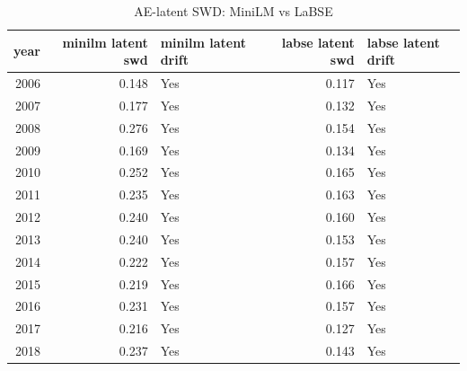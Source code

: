 \begin{table}[ht]
\centering
\caption{AE-latent SWD: MiniLM vs LaBSE}
\label{tab:minilm_vs_labse_latent_swd}
\begin{tabular}{rrlrl}
\toprule
year & minilm latent swd & minilm latent drift & labse latent swd & labse latent drift \\
\midrule
2006 & 0.148 & Yes & 0.117 & Yes \\
2007 & 0.177 & Yes & 0.132 & Yes \\
2008 & 0.276 & Yes & 0.154 & Yes \\
2009 & 0.169 & Yes & 0.134 & Yes \\
2010 & 0.252 & Yes & 0.165 & Yes \\
2011 & 0.235 & Yes & 0.163 & Yes \\
2012 & 0.240 & Yes & 0.160 & Yes \\
2013 & 0.240 & Yes & 0.153 & Yes \\
2014 & 0.222 & Yes & 0.157 & Yes \\
2015 & 0.219 & Yes & 0.166 & Yes \\
2016 & 0.231 & Yes & 0.157 & Yes \\
2017 & 0.216 & Yes & 0.127 & Yes \\
2018 & 0.237 & Yes & 0.143 & Yes \\
\bottomrule
\end{tabular}
\end{table}

